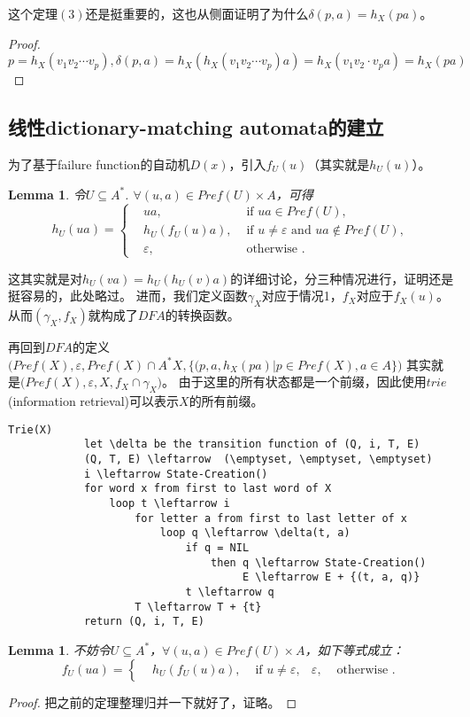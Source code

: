 \documentclass[UTF8]{ctexart}
\newtheorem{lem}[thm]{Lemma}
\theoremstyle{definition}
\theoremstyle{remark}
\numberwithin{equation}{subsection}
\begin{document}
	这个定理$(3)$还是挺重要的，这也从侧面证明了为什么$\delta(p,a)=h_X(pa)$。
	\begin{proof}
		$p = h_X(v_1v_2 \cdots v_p), \delta(p, a) = h_X(h_X(v_1v_2 \cdots v_p)a) = h_X(v_1v_2 \cdot v_p a)=h_X(pa)$
	\end{proof}
	
\subsection{线性dictionary-matching automata的建立}
	
	为了基于failure function的自动机$D(x)$，引入$f_U(u)$（其实就是$h_U(u)$）。
	\begin{lem}
		令$U \subseteq A^*$. $\forall (u,a) \in Pref(U) \times A$，可得
		\[
			h_U(ua) =
			\left\{
				\begin{aligned}
					&ua, &\text{ if } ua \in Pref(U),  \\
					&h_U(f_U(u)a), &\text{ if } u \neq \varepsilon \text{ and } ua \notin Pref(U), \\
					&\varepsilon, &\text{ otherwise }.
				\end{aligned}
			\right .
		\]
	\end{lem}
	这其实就是对$h_U(va) = h_U(h_U(v)a)$的详细讨论，分三种情况进行，证明还是挺容易的，此处略过。
	进而，我们定义函数$\gamma_X$对应于情况1，$f_X$对应于$f_X(u)$。从而$(\gamma_X, f_X)$就构成了$DFA$的转换函数。
	
	再回到$DFA$的定义$\Big( Pref(X), \varepsilon, Pref(X) \cap A^*X, \{(p,a,h_X(pa) | p \in Pref(X), a \in A\} \Big)$
	其实就是$\Big( Pref(X), \varepsilon, X, f_X \cap \gamma_X \Big)$。
	由于这里的所有状态都是一个前缀，因此使用$trie$(information retrieval)可以表示$X$的所有前缀。
	\begin{lstlisting}[frame=shadowbox,framexleftmargin=5mm,rulesepcolor=\color{gray},numbers=none]
		Trie(X)
			let \delta be the transition function of (Q, i, T, E)
			(Q, T, E) \leftarrow  (\emptyset, \emptyset, \emptyset)
			i \leftarrow State-Creation()
			for word x from first to last word of X
				loop t \leftarrow i
					for letter a from first to last letter of x
						loop q \leftarrow \delta(t, a)
							if q = NIL
								then q \leftarrow State-Creation()
									 E \leftarrow E + {(t, a, q)}
							t \leftarrow q
					T \leftarrow T + {t}
			return (Q, i, T, E)
	\end{lstlisting}
	
	\begin{lem}
		不妨令$U \subseteq A^*$，$\forall (u,a) \in Pref(U) \times A$，如下等式成立：
		\[
			f_U(ua) =
			\left\{
				\begin{aligned}
					&h_U(f_U(u)a), &\text{ if } u \neq \varepsilon,
					&\varepsilon, &\text{ otherwise }.
				\end{aligned}
			\right .
		\]
	\end{lem}
	\begin{proof}
		把之前的定理整理归并一下就好了，证略。
	\end{proof}
	
\end{document}
